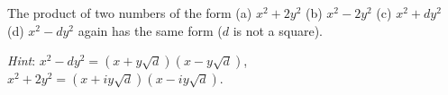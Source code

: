 The product of two numbers of the form (a) $x^2 + 2y^2$ (b) $x^2 - 2y^2$ (c) $x^2 + dy^2$ (d) $x^2 - dy^2$ again has the same form ($d$ is not a square).

\emph{Hint}: $x^2 - dy^2 = (x + y\sqrt{d})(x - y\sqrt{d})$, $x^2 + 2y^2 = (x + iy\sqrt{d})(x - iy\sqrt{d})$.
